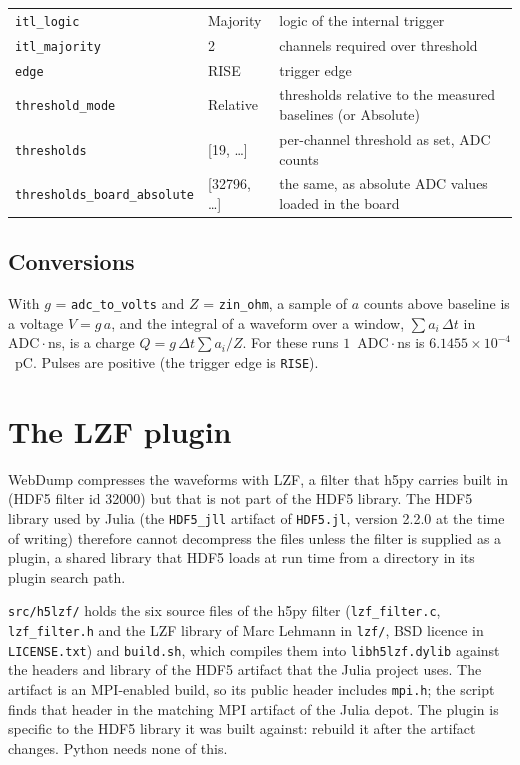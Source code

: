 \documentclass[11pt]{article}
\newcommand{\code}[1]{\texttt{#1}}
\begin{document}
\begin{longtable}{l l p{72mm}}
\code{itl\_logic}           & Majority & logic of the internal trigger \\
\code{itl\_majority}        & 2 & channels required over threshold \\
\code{edge}                 & RISE & trigger edge \\
\code{threshold\_mode}      & Relative & thresholds relative to the measured baselines (or Absolute) \\
\code{thresholds}           & [19, \dots] & per-channel threshold as set, ADC counts \\
\code{thresholds\_board\_absolute} & [32796, \dots] & the same, as absolute ADC values loaded in the board \\
\bottomrule
\end{longtable}

\subsection{Conversions}

With $g$ = \code{adc\_to\_volts} and $Z$ = \code{zin\_ohm}, a sample of $a$
counts above baseline is a voltage $V = g\,a$, and the integral of a waveform
over a window, $\sum a_i\,\Delta t$ in ADC\,$\cdot$\,ns, is a charge
$Q = g\,\Delta t \sum a_i / Z$. For these runs $1$~ADC\,$\cdot$\,ns is
$6.1455\times10^{-4}$~pC. Pulses are positive (the trigger edge is
\code{RISE}).

\section{The LZF plugin}\label{sec:lzf}

WebDump compresses the waveforms with LZF, a filter that h5py carries built
in (HDF5 filter id 32000) but that is not part of the HDF5 library. The HDF5
library used by Julia (the \code{HDF5\_jll} artifact of \code{HDF5.jl},
version 2.2.0 at the time of writing) therefore cannot decompress the files
unless the filter is supplied as a plugin, a shared library that HDF5 loads
at run time from a directory in its plugin search path.

\code{src/h5lzf/} holds the six source files of the h5py filter
(\code{lzf\_filter.c}, \code{lzf\_filter.h} and the LZF library of Marc
Lehmann in \code{lzf/}, BSD licence in \code{LICENSE.txt}) and
\code{build.sh}, which compiles them into \code{libh5lzf.dylib} against the
headers and library of the HDF5 artifact that the Julia project uses. The
artifact is an MPI-enabled build, so its public header includes
\code{mpi.h}; the script finds that header in the matching MPI artifact of
the Julia depot. The plugin is specific to the HDF5 library it was built
against: rebuild it after the artifact changes. Python needs none of this.
\end{document}
